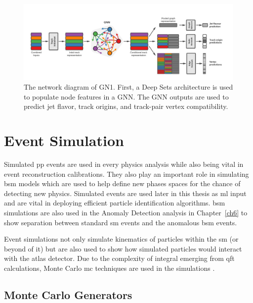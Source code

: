 \begin{figure}[h]
    \centering
    \includegraphics[scale=0.38]{figs/ch4/GNN-diagram.jpg}
    \caption{ The network diagram of GN1. First, a Deep Sets architecture is used to populate node features in a GNN. The GNN outputs are used to predict jet flavor, track origins, and track-pair vertex compatibility. \cite{gnn-ftag}}
\label{fig:gnn-diagram}
\end{figure}



\section{Event Simulation}\label{sec:event-sim}

Simulated \gls{pp} events are used in every physics analysis while also being vital in event reconstruction calibrations. They also play an important role in simulating \gls{bsm} 
models which are used to help define new phases spaces for the chance of detecting new physics. Simulated events are used later in this thesis as \gls{ml} input and are vital 
in deploying efficient particle identification algorithms. \gls{bsm} simulations are also used in the Anomaly Detection analysis in Chapter~\ref{ch6} to show separation 
between standard \gls{sm} events and the anomalous \gls{bsm} events. 
\par
Event simulations not only simulate kinematics of particles within the \gls{sm} (or beyond of it) but are also used to show how simulated particles would interact with the 
\gls{atlas} detector. Due to the complexity of integral emerging from \gls{qft} calculations, Monte Carlo \gls{mc} techniques are used in the simulations \cite{workman}.

\subsection{Monte Carlo Generators}



